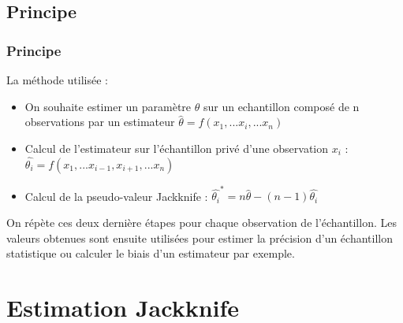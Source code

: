 \documentclass[handout]{beamer}
\begin{document}
		\subsection{Principe}
		\begin{frame}
			\frametitle{Principe}
% 
% 

			La méthode utilisée :
			\begin{itemize}
				\item On souhaite estimer un paramètre $\theta$ sur un echantillon composé de n observations par un estimateur $\hat{\theta} = f(x_1,...x_i,...x_n)$
				\item Calcul de l'estimateur sur l'échantillon privé d'une observation $x_i$ : $\hat{\theta_i} = f(x_1,...x_{i-1},x_{i+1},...x_n)$
				\item Calcul de la pseudo-valeur Jackknife : $\hat{\theta_i}^* = n\hat{\theta} - (n-1) \hat{\theta_i}$
			\end{itemize}
			
			\vspace{15px}
			
			On répète ces deux dernière étapes pour chaque observation de l'échantillon. Les valeurs obtenues sont ensuite utilisées pour estimer la précision d'un échantillon statistique ou calculer le biais d'un estimateur par exemple.

% 
		\end{frame}

	\section{Estimation Jackknife}

\end{document}
